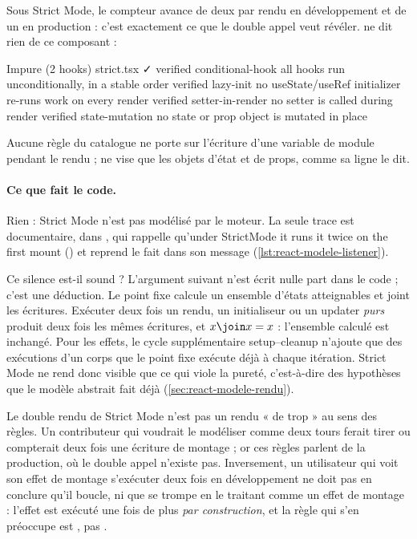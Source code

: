 Sous Strict Mode, le compteur avance de deux par rendu en développement et de
un en production : c'est exactement ce que le double appel veut révéler.
\reactant{} ne dit rien de ce composant :

\begin{sortie}
  Impure  (2 hooks)  strict.tsx  ✓
    verified  conditional-hook  all hooks run unconditionally, in a stable order
    verified  lazy-init  no useState/useRef initializer re-runs work on every render
    verified  setter-in-render  no setter is called during render
    verified  state-mutation  no state or prop object is mutated in place
\end{sortie}

Aucune règle du catalogue ne porte sur l'écriture d'une variable de module
pendant le rendu ;  ne vise que les objets d'état et de
props, comme sa ligne  le dit.

\paragraph{Ce que fait le code.} Rien : Strict Mode n'est pas modélisé par le
moteur. La seule trace est documentaire, dans , qui
rappelle qu'\og under StrictMode it runs it twice on the first mount\fg{}
() et reprend le fait dans son
message (\cref{lst:react-modele-listener}).

Ce silence est-il sound ? L'argument suivant n'est écrit nulle part dans le
code ; c'est une déduction. Le point fixe calcule un ensemble d'états
atteignables et joint les écritures. Exécuter deux fois un rendu, un
initialiseur ou un updater \emph{purs} produit deux fois les mêmes écritures, et
$x \join x = x$ : l'ensemble calculé est inchangé. Pour les effets, le cycle
supplémentaire setup--cleanup n'ajoute que des exécutions d'un corps que le
point fixe exécute déjà à chaque itération. Strict Mode ne rend donc visible
que ce qui viole la pureté, c'est-à-dire des hypothèses que le modèle abstrait
fait déjà (\cref{sec:react-modele-rendu}).

\begin{piege}
Le double rendu de Strict Mode n'est pas un rendu « de trop » au sens des
règles. Un contributeur qui voudrait le modéliser comme deux tours ferait
tirer  ou compterait deux fois une écriture de
montage ; or ces règles parlent de la production, où le double appel n'existe
pas. Inversement, un utilisateur qui voit son effet de montage s'exécuter deux
fois en développement ne doit pas en conclure qu'il boucle, ni que
\reactant{} se trompe en le traitant comme un effet de montage : l'effet est
exécuté une fois de plus \emph{par construction}, et la règle qui s'en préoccupe est
, pas .
\end{piege}

